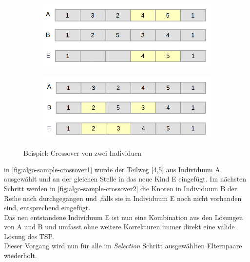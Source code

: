 \documentclass[12pt,a4paper]{scrreprt}
\begin{document}
\begin{figure}[ht]
	\centering
	\begin{subfigure}[t]{400pt}
    	\includegraphics[width=400pt]{images/algo_04_crossover_1.png}
        \caption{}
        \label{fig:algo-sample-crossover1}
    \end{subfigure}

    \begin{subfigure}[t]{400pt}
    	\includegraphics[width=400pt]{images/algo_04_crossover_2.png}
        \caption{}
        \label{fig:algo-sample-crossover2}
    \end{subfigure}

	\caption{Beispiel: Crossover von zwei Individuen}
	\label{fig:algo-sample-crossover}
\end{figure}

in \autoref{fig:algo-sample-crossover1} wurde der Teilweg [4,5] aus Individuum A ausgewählt und an der gleichen Stelle in das neue Kind E eingefügt. Im nächsten Schritt werden in \autoref{fig:algo-sample-crossover2} die Knoten in Individuum B der Reihe nach durchgegangen und ,falls sie in Individuum E noch nicht vorhanden sind, entsprechend eingefügt.\\
Das neu entstandene Individuum E ist nun eine Kombination aus den Lösungen von A und B und umfasst ohne weitere Korrekturen immer direkt eine valide Lösung des TSP.\\
Dieser Vorgang wird nun für alle im \textit{Selection} Schritt ausgewählten Elternpaare wiederholt.
\end{document}

